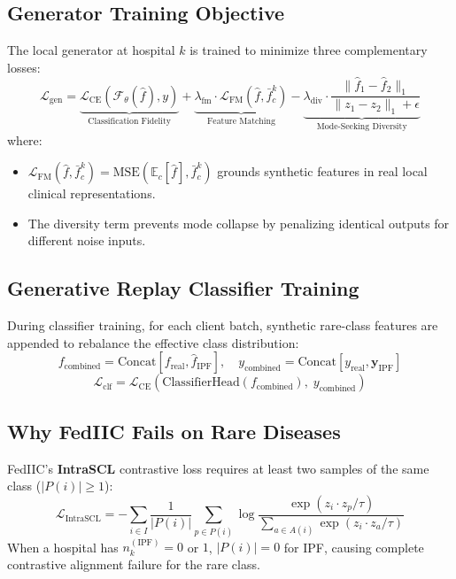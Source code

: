 \documentclass[12pt,a4paper]{report}
\begin{document}
\subsection{Generator Training Objective}
The local generator at hospital $k$ is trained to minimize three complementary losses:
\begin{equation}
    \mathcal{L}_{\text{gen}} = \underbrace{\mathcal{L}_{\text{CE}}(\mathcal{F}_\theta(\hat{f}), y)}_{\text{Classification Fidelity}} + \underbrace{\lambda_{\text{fm}} \cdot \mathcal{L}_{\text{FM}}(\hat{f}, \bar{f}_c^k)}_{\text{Feature Matching}} - \underbrace{\lambda_{\text{div}} \cdot \frac{\|\hat{f}_1 - \hat{f}_2\|_1}{\|z_1 - z_2\|_1 + \epsilon}}_{\text{Mode-Seeking Diversity}}
    \label{eq:gen_loss}
\end{equation}
where:
\begin{itemize}
    \item $\mathcal{L}_{\text{FM}}(\hat{f}, \bar{f}_c^k) = \text{MSE}\!\left(\mathbb{E}_{c}[\hat{f}], \bar{f}_c^k\right)$ grounds synthetic features in real local clinical representations.
    \item The diversity term prevents mode collapse by penalizing identical outputs for different noise inputs.
\end{itemize}

\subsection{Generative Replay Classifier Training}
During classifier training, for each client batch, synthetic rare-class features are appended to rebalance the effective class distribution:
\begin{equation}
    f_{\text{combined}} = \text{Concat}\!\left[f_{\text{real}}, \hat{f}_{\text{IPF}}\right], \quad
    y_{\text{combined}} = \text{Concat}\!\left[y_{\text{real}}, \mathbf{y}_\text{IPF}\right]
    \label{eq:replay}
\end{equation}
\begin{equation}
    \mathcal{L}_{\text{clf}} = \mathcal{L}_{\text{CE}}\!\left(\text{ClassifierHead}(f_{\text{combined}}), \; y_{\text{combined}}\right)
    \label{eq:clf_loss}
\end{equation}

\subsection{Why FedIIC Fails on Rare Diseases}
FedIIC's \textbf{IntraSCL} contrastive loss requires at least two samples of the same class ($|P(i)| \geq 1$):
\begin{equation}
    \mathcal{L}_{\text{IntraSCL}} = -\sum_{i \in I} \frac{1}{|P(i)|} \sum_{p \in P(i)} \log \frac{\exp(z_i \cdot z_p / \tau)}{\sum_{a \in A(i)} \exp(z_i \cdot z_a / \tau)}
    \label{eq:fediic_scl}
\end{equation}
When a hospital has $n_k^{(\text{IPF})} = 0$ or $1$, $|P(i)| = 0$ for IPF, causing complete contrastive alignment failure for the rare class.
\end{document}
